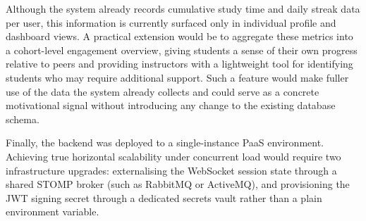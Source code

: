 Although the system already records cumulative study time and daily streak data per user,
this information is currently surfaced only in individual profile and dashboard views.
A practical extension would be to aggregate these metrics into a cohort-level engagement
overview, giving students a sense of their own progress relative to peers and providing
instructors with a lightweight tool for identifying students who may require additional
support. Such a feature would make fuller use of the data the system already collects
and could serve as a concrete motivational signal without introducing any change to the
existing database schema.

Finally, the backend was deployed to a single-instance PaaS environment. Achieving true
horizontal scalability under concurrent load would require two infrastructure upgrades:
externalising the WebSocket session state through a shared STOMP broker (such as RabbitMQ or
ActiveMQ), and provisioning the JWT signing secret through a dedicated secrets vault rather
than a plain environment variable.
